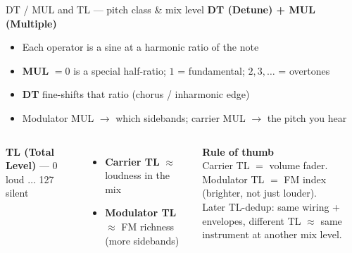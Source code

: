 \documentclass[aspectratio=169,11pt]{beamer}
\begin{document}
\begin{frame}{DT / MUL and TL --- pitch class \& mix level}
  \textbf{DT (Detune) + MUL (Multiple)}
  \begin{itemize}
    \item Each operator is a sine at a harmonic ratio of the note
    \item \textbf{MUL} $=0$ is a special half-ratio; $1$ = fundamental; $2,3,\ldots$ = overtones
    \item \textbf{DT} fine-shifts that ratio (chorus / inharmonic edge)
    \item Modulator MUL $\rightarrow$ which sidebands; carrier MUL $\rightarrow$ the pitch you hear
  \end{itemize}
  \vspace{1.5mm}
  \begin{columns}[T,onlytextwidth]
    \textbf{TL (Total Level)} --- 0 loud $\ldots$ 127 silent
    \begin{itemize}
      \item \textbf{Carrier TL} $\approx$ loudness in the mix
      \item \textbf{Modulator TL} $\approx$ FM richness (more sidebands)
    \end{itemize}
    {\small
    \textbf{Rule of thumb}\\[0.8mm]
    Carrier TL $=$ volume fader.\\
    Modulator TL $=$ FM index (brighter, not just louder).\\[1mm]
    {\scriptsize Later TL-dedup: same wiring + envelopes, different TL $\approx$ same instrument at another mix level.}
    }
  \end{columns}
\end{frame}
\end{document}
